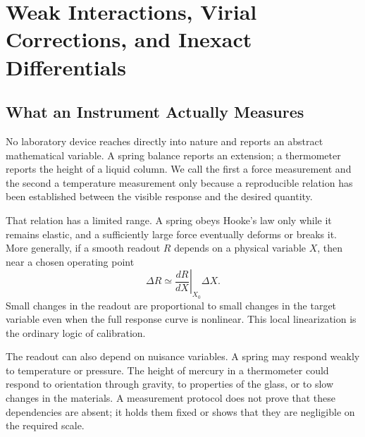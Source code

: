 \chapter{Weak Interactions, Virial Corrections, and Inexact Differentials}


\section{What an Instrument Actually Measures}

No laboratory device reaches directly into nature and reports an abstract
mathematical variable.  A spring balance reports an extension; a thermometer
reports the height of a liquid column.  We call the first a force measurement
and the second a temperature measurement only because a reproducible relation
has been established between the visible response and the desired quantity.

That relation has a limited range.  A spring obeys Hooke's law only while it
remains elastic, and a sufficiently large force eventually deforms or breaks
it.  More generally, if a smooth readout \(R\) depends on a physical variable
\(X\), then near a chosen operating point
\begin{equation}
 \Delta R \simeq
 \left.\frac{dR}{dX}\right|_{X_0}\Delta X.
 \label{eq:sm6-local-linear-response}
\end{equation}
Small changes in the readout are proportional to small changes in the target
variable even when the full response curve is nonlinear.  This local
linearization is the ordinary logic of calibration.

The readout can also depend on nuisance variables.  A spring may respond
weakly to temperature or pressure.  The height of mercury in a thermometer
could respond to orientation through gravity, to properties of the glass, or
to slow changes in the materials.  A measurement protocol does not prove
that these dependencies are absent; it holds them fixed or shows that they
are negligible on the required scale.

